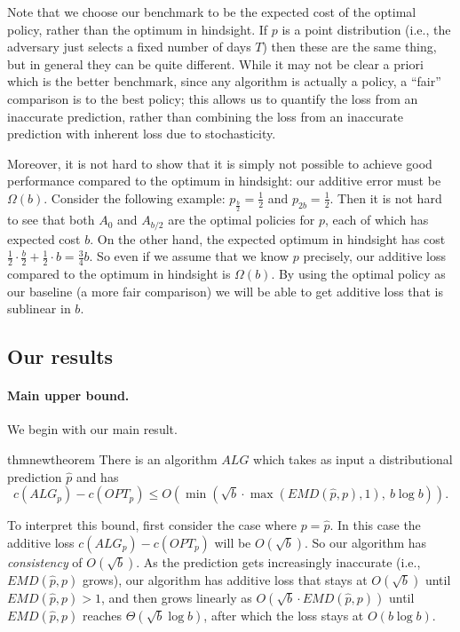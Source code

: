 Note that we choose our benchmark to be the expected cost of the optimal policy, rather than the optimum in hindsight.  If $p$ is a point distribution (i.e., the adversary just selects a fixed number of days $T$) then these are the same thing, but in general they can be quite different.  While it may not be clear a priori which is the better benchmark, since any algorithm is actually a policy, a ``fair'' comparison is to the best policy; this allows us to quantify the loss from an inaccurate prediction, rather than combining the loss from an inaccurate prediction with inherent loss due to stochasticity.  

Moreover, it is not hard to show that it is simply not possible to achieve good performance compared to the optimum in hindsight: our additive error must be $\Omega(b)$. Consider the following example: $p_{\frac{b}{2}}=\frac{1}{2}$ and $p_{2b}=\frac{1}{2}$. Then it is not hard to see that both $A_0$ and $A_{b/2}$ are the optimal policies for $p$, each of which has expected cost $b$. On the other hand, the expected optimum in hindsight has cost $\frac{1}{2} \cdot \frac{b}{2} + \frac{1}{2} \cdot b = \frac{3}{4}b$. So even if we assume that we know $p$ precisely, our additive loss compared to the optimum in hindsight is $\Omega(b)$.  By using the optimal policy as our baseline (a more fair comparison) we will be able to get additive loss that is sublinear in $b$.  


\subsection{Our results} \label{sec:results}

\paragraph{Main upper bound.}  We begin with our main result.

\begin{restatable}{thm}{newtheorem} \label{thm:new theorem}
    There is an algorithm $ALG$ which takes as input a distributional prediction $\hat p$ and has
    \[c(ALG_p) - c(OPT_p) \leq O\left( \min\left( \sqrt{b}\cdot \max\left(EMD(\hat p, p), 1\right),\ b\log b\right) \right).\]
\end{restatable}

To interpret this bound, first consider the case where $p = \hat p$.  In this case the additive loss $c(ALG_p) - c(OPT_p)$ will be $O(\sqrt{b})$.  So our algorithm has \emph{consistency} of $O(\sqrt{b})$.  As the prediction gets increasingly inaccurate (i.e., $EMD(\hat p, p)$ grows), our algorithm has additive loss that stays at $O(\sqrt{b})$ until $EMD(\hat p, p) > 1$, and then grows linearly as $O(\sqrt{b} \cdot EMD(\hat p, p))$ until $EMD(\hat p, p)$ reaches $\Theta(\sqrt{b} \log b)$, after which the loss stays at $O(b \log b)$.  

